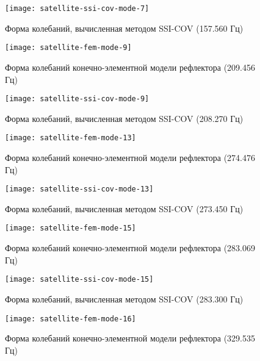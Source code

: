 \begin{figure}[H]
	\centerfloat
	\texttt{[image: satellite-ssi-cov-mode-7]}
	\caption{Форма колебаний, вычисленная методом SSI-COV (157.560 Гц)} \label{satellite-ssi-cov-mode-7}
\end{figure}

\begin{figure}[H]
	\centerfloat
	\texttt{[image: satellite-fem-mode-9]}
	\caption{Форма колебаний конечно-элементной модели рефлектора (209.456 Гц)} \label{satellite-fem-mode-9}
\end{figure}

\begin{figure}[H]
	\centerfloat
	\texttt{[image: satellite-ssi-cov-mode-9]}
	\caption{Форма колебаний, вычисленная методом SSI-COV (208.270 Гц)} \label{satellite-ssi-cov-mode-9}
\end{figure}

\begin{figure}[H]
	\centerfloat
	\texttt{[image: satellite-fem-mode-13]}
	\caption{Форма колебаний конечно-элементной модели рефлектора (274.476 Гц)} \label{satellite-fem-mode-13}
\end{figure}

\begin{figure}[H]
	\centerfloat
	\texttt{[image: satellite-ssi-cov-mode-13]}
	\caption{Форма колебаний, вычисленная методом SSI-COV (273.450 Гц)} \label{satellite-ssi-cov-mode-13}
\end{figure}

\begin{figure}[H]
	\centerfloat
	\texttt{[image: satellite-fem-mode-15]}
	\caption{Форма колебаний конечно-элементной модели рефлектора (283.069 Гц)} \label{satellite-fem-mode-15}
\end{figure}

\begin{figure}[H]
	\centerfloat
	\texttt{[image: satellite-ssi-cov-mode-15]}
	\caption{Форма колебаний, вычисленная методом SSI-COV (283.300 Гц)} \label{satellite-ssi-cov-mode-15}
\end{figure}

\begin{figure}[H]
	\centerfloat
	\texttt{[image: satellite-fem-mode-16]}
	\caption{Форма колебаний конечно-элементной модели рефлектора (329.535 Гц)} \label{satellite-fem-mode-16}
\end{figure}

